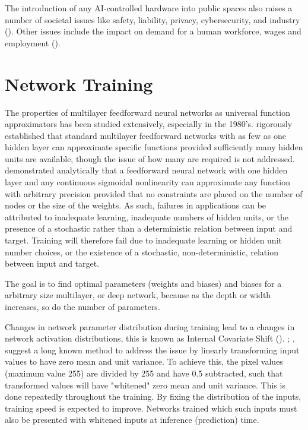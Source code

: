 The introduction of any AI-controlled hardware into public spaces also raises a number of societal issues like safety, liability, privacy, cybersecurity, and industry (\cite{Taeihagh_2018}).
Other issues include the impact on demand for a human workforce, wages and employment (\cite{acemoglu2018artificial}).



\section{Network Training}


The properties of multilayer feedforward neural networks as universal function approximators has been studied extensively, especially in the 1980's. \cite{hornik1989multilayer} rigorously established that standard multilayer feedforward networks with as few as one hidden layer can approximate specific functions provided sufficiently many hidden units are available, though the issue of how many are required is not addressed. \cite{cybenko1989approximation} demonstrated analytically that a feedforward neural network with one hidden layer and any continuous sigmoidal nonlinearity can approximate any function with arbitrary precision provided that
no constraints are placed on the number of nodes or the size of the weights. As such, failures in applications can be attributed to inadequate learning, inadequate numbers of hidden units, or the presence of a  stochastic rather than a deterministic relation between input and target.
Training will therefore fail due to inadequate learning or hidden unit number choices, or the existence of a stochastic, non-deterministic, relation between input and target. 

The goal is to find optimal parameters (weights and biases) and biases for a arbitrary size multilayer, or deep network, because as the depth or width increases, so do the number of parameters.  

Changes in network parameter distribution during training lead to a changes in network activation distributions, this is known as Internal Covariate Shift (\cite{ioffe2015batch, 7005077}). \cite{lecun1998gradient}; \cite{wiesler2011convergence}, suggest a long known method to address the issue by linearly transforming input values to have zero mean and unit variance. To achieve this, the pixel values (maximum value 255) are divided by 255 and have 0.5 subtracted, such that transformed values will have "whitened" zero mean and unit variance. This is done repeatedly throughout the training. By fixing the distribution of the inputs, training speed is expected to improve.
Networks trained which such inputs must also be presented with whitened inputs at inference (prediction) time.

